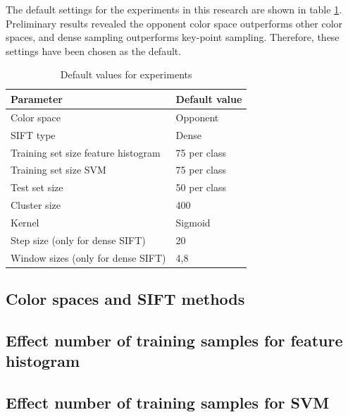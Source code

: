 The default settings for the experiments in this research are shown in table \ref{tab:default}. Preliminary results revealed the opponent color space outperforms other color spaces, and dense sampling outperforms key-point sampling. Therefore, these settings have been chosen as the default.
\begin{table}[H]
\begin{center}
\begin{tabular}{|l|l|}
\hline
\textbf{Parameter} & \textbf{Default value}\\
\hline
Color space & Opponent\\
SIFT type & Dense\\
Training set size feature histogram & 75 per class\\
Training set size SVM & 75 per class\\
Test set size & 50 per class \\
Cluster size & 400 \\
Kernel & Sigmoid \\
Step size (only for dense SIFT) & 20\\
Window sizes (only for dense SIFT) & 4,8\\
\hline
\end{tabular}
\caption{Default values for experiments}
\label{tab:default}
\end{center}
\end{table}


\subsection{Color spaces and SIFT methods}


\subsection{Effect number of training samples for feature histogram}


\subsection{Effect number of training samples for SVM}











